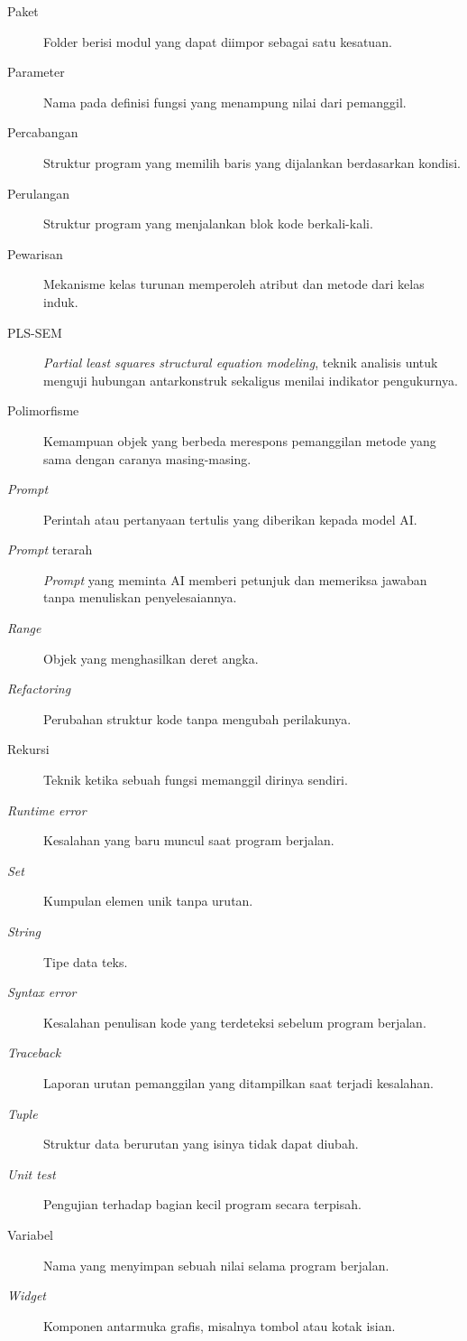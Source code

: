 \begin{description}
  \item[Paket] Folder berisi modul yang dapat diimpor sebagai satu kesatuan.
  \item[Parameter] Nama pada definisi fungsi yang menampung nilai dari pemanggil.
  \item[Percabangan] Struktur program yang memilih baris yang dijalankan berdasarkan kondisi.
  \item[Perulangan] Struktur program yang menjalankan blok kode berkali-kali.
  \item[Pewarisan] Mekanisme kelas turunan memperoleh atribut dan metode dari kelas induk.
  \item[PLS-SEM] \textit{Partial least squares structural equation modeling}, teknik analisis untuk menguji hubungan antarkonstruk sekaligus menilai indikator pengukurnya.
  \item[Polimorfisme] Kemampuan objek yang berbeda merespons pemanggilan metode yang sama dengan caranya masing-masing.
  \item[\textit{Prompt}] Perintah atau pertanyaan tertulis yang diberikan kepada model AI.
  \item[\textit{Prompt} terarah] \textit{Prompt} yang meminta AI memberi petunjuk dan memeriksa jawaban tanpa menuliskan penyelesaiannya.
  \item[\textit{Range}] Objek yang menghasilkan deret angka.
  \item[\textit{Refactoring}] Perubahan struktur kode tanpa mengubah perilakunya.
  \item[Rekursi] Teknik ketika sebuah fungsi memanggil dirinya sendiri.
  \item[\textit{Runtime error}] Kesalahan yang baru muncul saat program berjalan.
  \item[\textit{Set}] Kumpulan elemen unik tanpa urutan.
  \item[\textit{String}] Tipe data teks.
  \item[\textit{Syntax error}] Kesalahan penulisan kode yang terdeteksi sebelum program berjalan.
  \item[\textit{Traceback}] Laporan urutan pemanggilan yang ditampilkan saat terjadi kesalahan.
  \item[\textit{Tuple}] Struktur data berurutan yang isinya tidak dapat diubah.
  \item[\textit{Unit test}] Pengujian terhadap bagian kecil program secara terpisah.
  \item[Variabel] Nama yang menyimpan sebuah nilai selama program berjalan.
  \item[\textit{Widget}] Komponen antarmuka grafis, misalnya tombol atau kotak isian.
\end{description}
